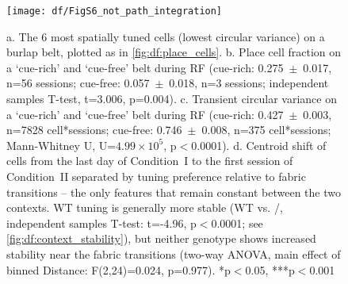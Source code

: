 \begin{figure}
	\centering
	\texttt{[image: df/FigS6\_not\_path\_integration]}
	\caption[No place cells on a cue-free belt and spatial tuning near the fabric-transition is not more stable]{a. The 6 most spatially tuned cells (lowest circular variance) on a burlap belt, plotted as in \autoref{fig:df:place_cells}.
	b. Place cell fraction on a `cue-rich' and `cue-free' belt during RF (cue-rich: 0.275~$\pm$~0.017, n=56 sessions; cue-free: 0.057~$\pm$~0.018, n=3 sessions; independent samples T-test, t=3.006, p=0.004).
	c. Transient circular variance on a `cue-rich' and `cue-free' belt during RF (cue-rich: 0.427~$\pm$~0.003, n=7828 cell*sessions; cue-free: 0.746~$\pm$~0.008, n=375 cell*sessions; Mann-Whitney U, U=$4.99\times10^5$, p$<$0.0001). d. Centroid shift of cells from the last day of Condition~I to the first session of Condition~II separated by tuning preference relative to fabric transitions -- the only features that remain constant between the two contexts. WT tuning is generally more stable (WT vs. \df/, independent samples T-test: t=-4.96, p$<$0.0001; see \autoref{fig:df:context_stability}), but neither genotype shows increased stability near the fabric transitions (two-way ANOVA, main effect of binned Distance: F(2,24)=0.024, p=0.977). *p$<$0.05, ***p$<$0.001}
	\label{fig:df:not_path}
\end{figure}

